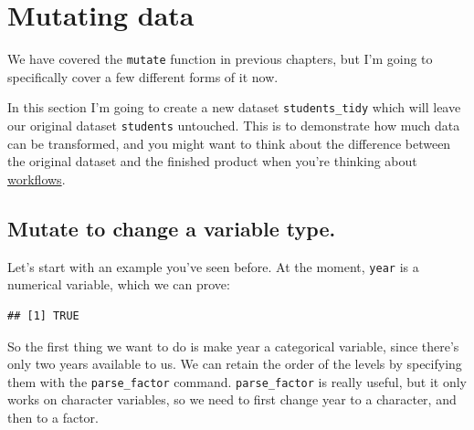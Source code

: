 \documentclass[
]{book}
\newenvironment{Shaded}{\begin{snugshade}}{\end{snugshade}}
\newcommand{\DataTypeTok}[1]{\textcolor[rgb]{0.13,0.29,0.53}{#1}}
\newcommand{\KeywordTok}[1]{\textcolor[rgb]{0.13,0.29,0.53}{\textbf{#1}}}
\newcommand{\NormalTok}[1]{#1}
\newcommand{\OperatorTok}[1]{\textcolor[rgb]{0.81,0.36,0.00}{\textbf{#1}}}
\newcommand{\StringTok}[1]{\textcolor[rgb]{0.31,0.60,0.02}{#1}}
\begin{document}
\hypertarget{mutate}{%
\section{Mutating data}\label{mutate}}

We have covered the \texttt{mutate} function in previous chapters, but I'm going to specifically cover a few different forms of it now.

In this section I'm going to create a new dataset \texttt{students\_tidy} which will leave our original dataset \texttt{students} untouched. This is to demonstrate how much data can be transformed, and you might want to think about the difference between the original dataset and the finished product when you're thinking about \protect\hyperlink{workflows}{workflows}.

\hypertarget{mutate-to-change-a-variable-type.}{%
\subsection{Mutate to change a variable type.}\label{mutate-to-change-a-variable-type.}}

Let's start with an example you've seen before. At the moment, \texttt{year} is a numerical variable, which we can prove:

\begin{Shaded}
\end{Shaded}

\begin{verbatim}
## [1] TRUE
\end{verbatim}

So the first thing we want to do is make year a categorical variable, since there's only two years available to us. We can retain the order of the levels by specifying them with the \texttt{parse\_factor} command. \texttt{parse\_factor} is really useful, but it only works on character variables, so we need to first change year to a character, and then to a factor.

\begin{Shaded}
\end{Shaded}
\end{document}
